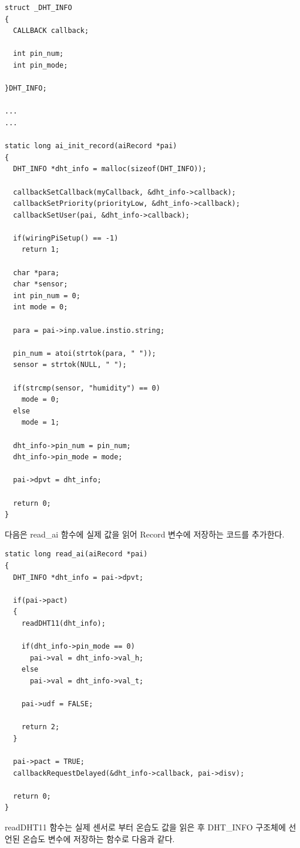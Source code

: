 \documentclass[11pt
  , a4paper
  , article
  , oneside
]{memoir}
\begin{document}
\begin{lstlisting}[style=termstylenumber, caption={Editing \texttt{/etc/fai/NFSROOT}}, label={list:nfsroot-file}]
struct _DHT_INFO
{	
  CALLBACK callback;

  int pin_num;
  int pin_mode;

}DHT_INFO;

...
...

static long ai_init_record(aiRecord *pai)
{
  DHT_INFO *dht_info = malloc(sizeof(DHT_INFO));

  callbackSetCallback(myCallback, &dht_info->callback);
  callbackSetPriority(priorityLow, &dht_info->callback);
  callbackSetUser(pai, &dht_info->callback);

  if(wiringPiSetup() == -1)
    return 1;

  char *para;
  char *sensor;
  int pin_num = 0;
  int mode = 0;

  para = pai->inp.value.instio.string;

  pin_num = atoi(strtok(para, " "));
  sensor = strtok(NULL, " ");

  if(strcmp(sensor, "humidity") == 0)
    mode = 0;
  else
    mode = 1;

  dht_info->pin_num = pin_num;
  dht_info->pin_mode = mode;

  pai->dpvt = dht_info;

  return 0;
}
\end{lstlisting}
다음은 read\_ai 함수에 실제 값을 읽어 Record 변수에 저장하는 코드를 추가한다.
\begin{lstlisting}[style=termstylenumber, caption={Editing \texttt{/etc/fai/NFSROOT}}, label={list:nfsroot-file}]
static long read_ai(aiRecord *pai)
{
  DHT_INFO *dht_info = pai->dpvt;

  if(pai->pact)
  {
    readDHT11(dht_info);

    if(dht_info->pin_mode == 0)
      pai->val = dht_info->val_h;
    else
      pai->val = dht_info->val_t;

    pai->udf = FALSE;

    return 2;
  }

  pai->pact = TRUE;
  callbackRequestDelayed(&dht_info->callback, pai->disv);

  return 0;
}
\end{lstlisting}
readDHT11 함수는 실제 센서로 부터 온습도 값을 읽은 후 DHT\_INFO 구조체에 선언된 온습도 변수에 저장하는 
함수로 다음과 같다.
\end{document}
